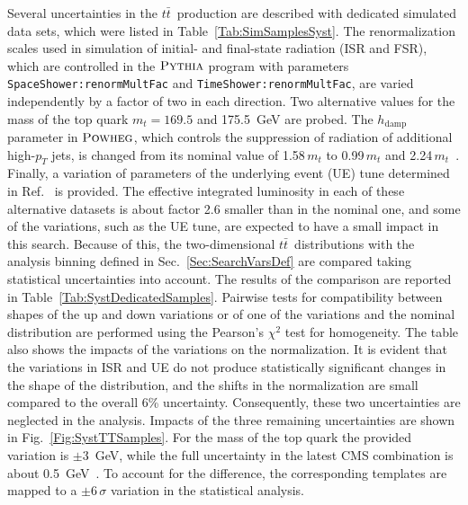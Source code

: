 Several uncertainties in the $t\bar t$~production are described with dedicated simulated data sets, which were listed in Table~\ref{Tab:SimSamplesSyst}.
The renormalization scales used in simulation of initial- and final-state radiation (ISR and FSR), which are controlled in the $\textsc{Pythia}$ program with parameters \texttt{SpaceShower:renormMultFac} and \texttt{TimeShower:renormMultFac}, are varied independently by a factor of two in each direction.
Two alternative values for the mass of the top quark $m_t = 169.5$ and 175.5~GeV are probed.
The $h_\text{damp}$ parameter in $\textsc{Powheg}$, which controls the suppression of radiation of additional high-$p_{T}$ jets, is changed from its nominal value of 1.58\,$m_t$ to 0.99\,$m_t$ and 2.24\,$m_t$~\cite{CMS-PAS-TOP-16-021}.
Finally, a variation of parameters of the underlying event (UE) tune determined in Ref.~\cite{CMS-PAS-TOP-16-021} is provided.
The effective integrated luminosity in each of these alternative datasets is about factor 2.6 smaller than in the nominal one, and some of the variations, such as the UE tune, are expected to have a small impact in this search.
Because of this, the two-dimensional $t\bar t$~distributions with the analysis binning defined in Sec.~\ref{Sec:SearchVarsDef} are compared taking statistical uncertainties into account.
The results of the comparison are reported in Table~\ref{Tab:SystDedicatedSamples}.
Pairwise tests for compatibility between shapes of the up and down variations or of one of the variations and the nominal distribution are performed using the Pearson's $\chi^2$ test for homogeneity.
The table also shows the impacts of the variations on the normalization.
It is evident that the variations in ISR and UE do not produce statistically significant changes in the shape of the distribution, and the shifts in the normalization are small compared to the overall 6\% uncertainty.
Consequently, these two uncertainties are neglected in the analysis.
Impacts of the three remaining uncertainties are shown in Fig.~\ref{Fig:SystTTSamples}.
For the mass of the top quark the provided variation is $\pm 3$~GeV, while the full uncertainty in the latest CMS combination is about 0.5~GeV~\cite{Khachatryan:2015hba}.
To account for the difference, the corresponding templates are mapped to a $\pm 6\,\sigma$ variation in the statistical analysis.

